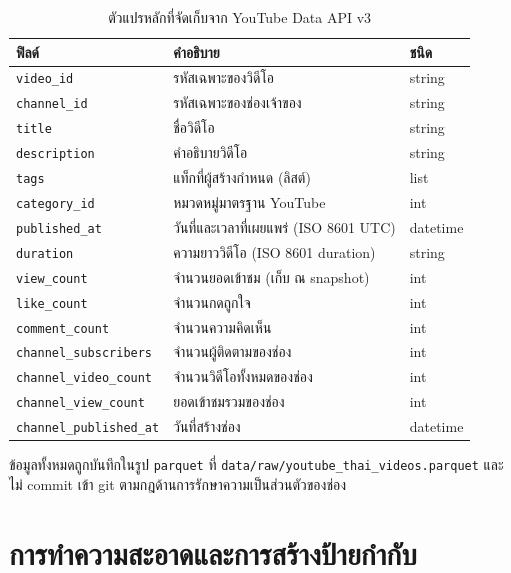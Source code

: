 \begin{table}[H]
\centering
\caption{ตัวแปรหลักที่จัดเก็บจาก YouTube Data API v3}
\label{tab:fields}
\small
\begin{tabularx}{\textwidth}{lXl}
\toprule
\textbf{ฟิลด์} & \textbf{คำอธิบาย} & \textbf{ชนิด} \\
\midrule
\texttt{video\_id}        & รหัสเฉพาะของวิดีโอ                       & string \\
\texttt{channel\_id}      & รหัสเฉพาะของช่องเจ้าของ                  & string \\
\texttt{title}            & ชื่อวิดีโอ                                & string \\
\texttt{description}      & คำอธิบายวิดีโอ                            & string \\
\texttt{tags}             & แท็กที่ผู้สร้างกำหนด (ลิสต์)             & list \\
\texttt{category\_id}     & หมวดหมู่มาตรฐาน YouTube                  & int \\
\texttt{published\_at}    & วันที่และเวลาที่เผยแพร่ (ISO 8601 UTC)    & datetime \\
\texttt{duration}         & ความยาววิดีโอ (ISO 8601 duration)         & string \\
\texttt{view\_count}      & จำนวนยอดเข้าชม (เก็บ ณ snapshot)         & int \\
\texttt{like\_count}      & จำนวนกดถูกใจ                              & int \\
\texttt{comment\_count}   & จำนวนความคิดเห็น                         & int \\
\texttt{channel\_subscribers}      & จำนวนผู้ติดตามของช่อง            & int \\
\texttt{channel\_video\_count}     & จำนวนวิดีโอทั้งหมดของช่อง        & int \\
\texttt{channel\_view\_count}      & ยอดเข้าชมรวมของช่อง               & int \\
\texttt{channel\_published\_at}    & วันที่สร้างช่อง                  & datetime \\
\bottomrule
\end{tabularx}
\end{table}

ข้อมูลทั้งหมดถูกบันทึกในรูป \texttt{parquet} ที่ \texttt{data/raw/youtube\_thai\_videos.parquet}
และไม่ commit เข้า git ตามกฎด้านการรักษาความเป็นส่วนตัวของช่อง

\section{การทำความสะอาดและการสร้างป้ายกำกับ}
\label{sec:method-labels}

